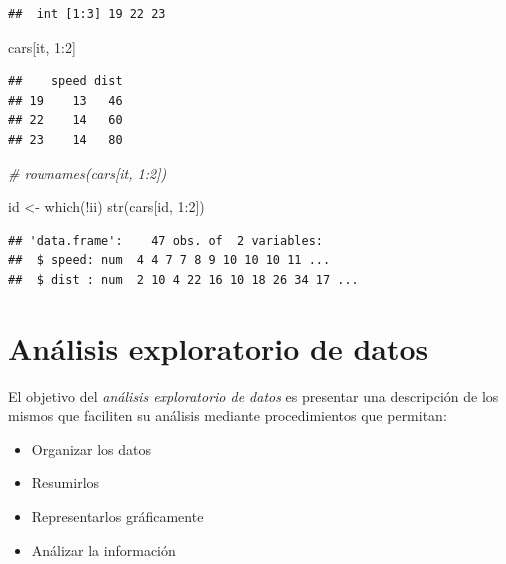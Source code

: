 \documentclass[
]{book}
\newenvironment{Shaded}{\begin{snugshade}}{\end{snugshade}}
\newcommand{\CommentTok}[1]{\textcolor[rgb]{0.56,0.35,0.01}{\textit{#1}}}
\newcommand{\DecValTok}[1]{\textcolor[rgb]{0.00,0.00,0.81}{#1}}
\newcommand{\FunctionTok}[1]{\textcolor[rgb]{0.00,0.00,0.00}{#1}}
\newcommand{\NormalTok}[1]{#1}
\newcommand{\OtherTok}[1]{\textcolor[rgb]{0.56,0.35,0.01}{#1}}
\newcommand{\SpecialCharTok}[1]{\textcolor[rgb]{0.00,0.00,0.00}{#1}}
\providecommand{\tightlist}{%
  \setlength{\itemsep}{0pt}\setlength{\parskip}{0pt}}
\theoremstyle{break}
\begin{document}
\begin{verbatim}
##  int [1:3] 19 22 23
\end{verbatim}

\begin{Shaded}
\begin{Highlighting}[]
\NormalTok{cars[it, }\DecValTok{1}\SpecialCharTok{:}\DecValTok{2}\NormalTok{]}
\end{Highlighting}
\end{Shaded}

\begin{verbatim}
##    speed dist
## 19    13   46
## 22    14   60
## 23    14   80
\end{verbatim}

\begin{Shaded}
\begin{Highlighting}[]
\CommentTok{\# rownames(cars[it, 1:2])}

\NormalTok{id }\OtherTok{\textless{}{-}} \FunctionTok{which}\NormalTok{(}\SpecialCharTok{!}\NormalTok{ii)}
\FunctionTok{str}\NormalTok{(cars[id, }\DecValTok{1}\SpecialCharTok{:}\DecValTok{2}\NormalTok{])}
\end{Highlighting}
\end{Shaded}

\begin{verbatim}
## 'data.frame':    47 obs. of  2 variables:
##  $ speed: num  4 4 7 7 8 9 10 10 10 11 ...
##  $ dist : num  2 10 4 22 16 10 18 26 34 17 ...
\end{verbatim}

\begin{Shaded}
\end{Shaded}

\hypertarget{anuxe1lisis-exploratorio-de-datos}{%
\chapter{Análisis exploratorio de datos}\label{anuxe1lisis-exploratorio-de-datos}}

El objetivo del \emph{análisis exploratorio de datos} es presentar una descripción de los
mismos que faciliten su análisis mediante procedimientos que permitan:

\begin{itemize}
\tightlist
\item
  Organizar los datos
\item
  Resumirlos
\item
  Representarlos gráficamente
\item
  Análizar la información
\end{itemize}
\end{document}
